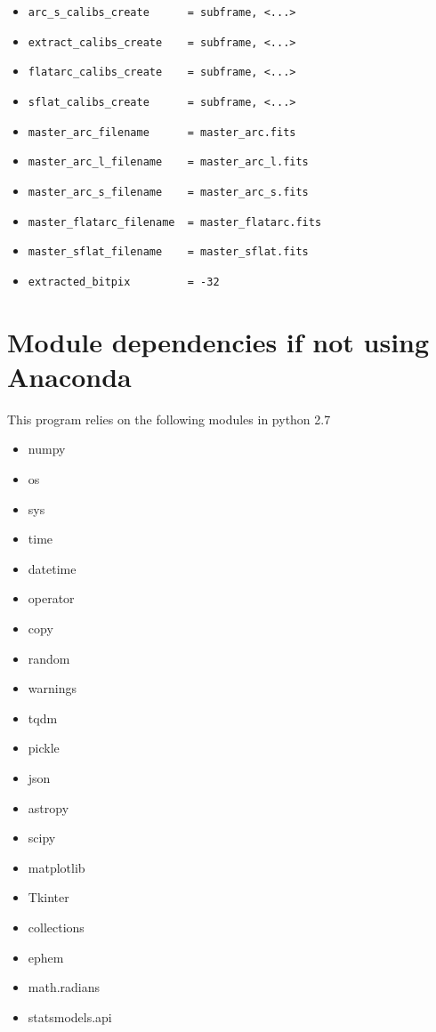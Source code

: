 \documentclass[10pt,a4paper]{article}
\begin{document}
\begin{itemize}
  \item \verb|arc_s_calibs_create      = subframe, <...>|
  \item \verb|extract_calibs_create    = subframe, <...>|
  \item \verb|flatarc_calibs_create    = subframe, <...>|
  \item \verb|sflat_calibs_create      = subframe, <...>|
  \item \verb|master_arc_filename      = master_arc.fits|
  \item \verb|master_arc_l_filename    = master_arc_l.fits|
  \item \verb|master_arc_s_filename    = master_arc_s.fits|
  \item \verb|master_flatarc_filename  = master_flatarc.fits|
  \item \verb|master_sflat_filename    = master_sflat.fits|
  \item \verb|extracted_bitpix         = -32|
\end{itemize}

\newpage

\appendix

\section{Module dependencies if not using Anaconda}
\label{section:module_dependency}
\noindent This program relies on the following modules in python 2.7

\begin{itemize}\setlength\itemsep{0em}
\item numpy
\item os
\item sys
\item time
\item datetime
\item operator
\item copy
\item random
\item warnings
\item tqdm
\item pickle
\item json
\item astropy
\item scipy
\item matplotlib
\item Tkinter
\item collections
\item ephem
\item math.radians
\item statsmodels.api
\end{itemize}

\end{document}
